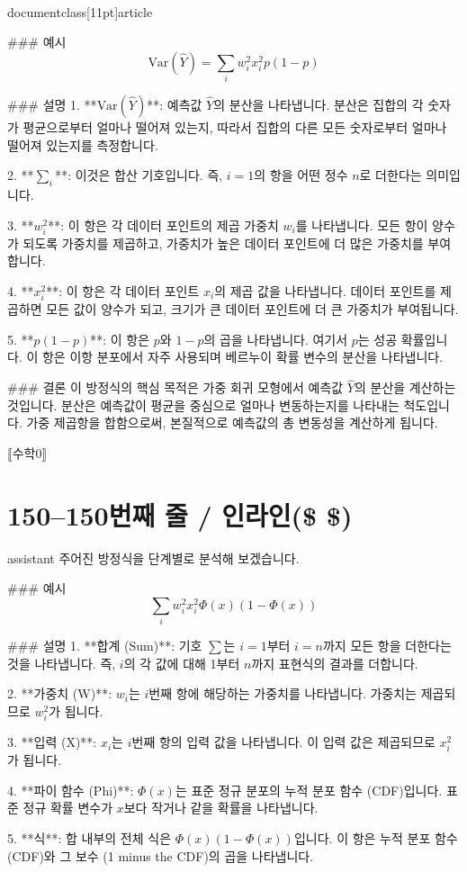 \\documentclass[11pt]{article}
\begin{document}
### 예시
\[
\text{Var}(\hat{Y}) = \sum_i w_i^2 x_i^2 p(1-p)
\]

### 설명
1. **\(\text{Var}(\hat{Y})\)**: 예측값 \(\hat{Y}\)의 분산을 나타냅니다. 분산은 집합의 각 숫자가 평균으로부터 얼마나 떨어져 있는지, 따라서 집합의 다른 모든 숫자로부터 얼마나 떨어져 있는지를 측정합니다.

2. **\(\sum_i\)**: 이것은 합산 기호입니다. 즉, \(i = 1\)의 항을 어떤 정수 \(n\)로 더한다는 의미입니다.

3. **\(w_i^2\)**: 이 항은 각 데이터 포인트의 제곱 가중치 \(w_i\)를 나타냅니다. 모든 항이 양수가 되도록 가중치를 제곱하고, 가중치가 높은 데이터 포인트에 더 많은 가중치를 부여합니다.

4. **\(x_i^2\)**: 이 항은 각 데이터 포인트 \(x_i\)의 제곱 값을 나타냅니다. 데이터 포인트를 제곱하면 모든 값이 양수가 되고, 크기가 큰 데이터 포인트에 더 큰 가중치가 부여됩니다.

5. **\(p(1-p)\)**: 이 항은 \(p\)와 \(1-p\)의 곱을 나타냅니다. 여기서 \(p\)는 성공 확률입니다. 이 항은 이항 분포에서 자주 사용되며 베르누이 확률 변수의 분산을 나타냅니다.

### 결론
이 방정식의 핵심 목적은 가중 회귀 모형에서 예측값 \(\hat{Y}\)의 분산을 계산하는 것입니다. 분산은 예측값이 평균을 중심으로 얼마나 변동하는지를 나타내는 척도입니다. 가중 제곱항을 합함으로써, 본질적으로 예측값의 총 변동성을 계산하게 됩니다.

⟦수학0⟧

\section*{150–150번째 줄 / 인라인(\$ \$) }
assistant
주어진 방정식을 단계별로 분석해 보겠습니다.

### 예시
\[
\sum_i w_i^2 x_i^2 \Phi(x) (1 - \Phi(x))
\]

### 설명
1. **합계 (Sum)**: 기호 \(\sum\)는 \(i = 1\)부터 \(i = n\)까지 모든 항을 더한다는 것을 나타냅니다. 즉, \(i\)의 각 값에 대해 1부터 \(n\)까지 표현식의 결과를 더합니다.

2. **가중치 (W)**: \(w_i\)는 \(i\)번째 항에 해당하는 가중치를 나타냅니다. 가중치는 제곱되므로 \(w_i^2\)가 됩니다.

3. **입력 (X)**: \(x_i\)는 \(i\)번째 항의 입력 값을 나타냅니다. 이 입력 값은 제곱되므로 \(x_i^2\)가 됩니다.

4. **파이 함수 (Phi)**: \(\Phi(x)\)는 표준 정규 분포의 누적 분포 함수 (CDF)입니다. 표준 정규 확률 변수가 \(x\)보다 작거나 같을 확률을 나타냅니다.

5. **식**: 합 내부의 전체 식은 \(\Phi(x) (1 - \Phi(x))\)입니다. 이 항은 누적 분포 함수(CDF)와 그 보수 (1 minus the CDF)의 곱을 나타냅니다.
\end{document}
